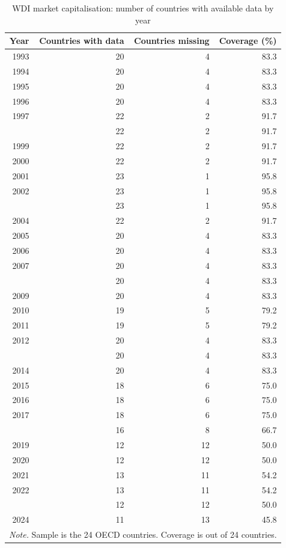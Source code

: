 \begin{table}[!h]
\centering
\caption{WDI market capitalisation: number of countries with available data by year}
\centering
\begin{tabular}[t]{rrrr}
\toprule
Year & Countries with data & Countries missing & Coverage (\%)\\
\midrule
1993 & 20 & 4 & 83.3\\
1994 & 20 & 4 & 83.3\\
1995 & 20 & 4 & 83.3\\
1996 & 20 & 4 & 83.3\\
1997 & 22 & 2 & 91.7\\
\addlinespace
1998 & 22 & 2 & 91.7\\
1999 & 22 & 2 & 91.7\\
2000 & 22 & 2 & 91.7\\
2001 & 23 & 1 & 95.8\\
2002 & 23 & 1 & 95.8\\
\addlinespace
2003 & 23 & 1 & 95.8\\
2004 & 22 & 2 & 91.7\\
2005 & 20 & 4 & 83.3\\
2006 & 20 & 4 & 83.3\\
2007 & 20 & 4 & 83.3\\
\addlinespace
2008 & 20 & 4 & 83.3\\
2009 & 20 & 4 & 83.3\\
2010 & 19 & 5 & 79.2\\
2011 & 19 & 5 & 79.2\\
2012 & 20 & 4 & 83.3\\
\addlinespace
2013 & 20 & 4 & 83.3\\
2014 & 20 & 4 & 83.3\\
2015 & 18 & 6 & 75.0\\
2016 & 18 & 6 & 75.0\\
2017 & 18 & 6 & 75.0\\
\addlinespace
2018 & 16 & 8 & 66.7\\
2019 & 12 & 12 & 50.0\\
2020 & 12 & 12 & 50.0\\
2021 & 13 & 11 & 54.2\\
2022 & 13 & 11 & 54.2\\
\addlinespace
2023 & 12 & 12 & 50.0\\
2024 & 11 & 13 & 45.8\\
\bottomrule
\multicolumn{4}{l}{\rule{0pt}{1em}\textit{Note.} Sample is the 24 OECD countries. Coverage is out of 24 countries.}\\
\end{tabular}
\end{table}
